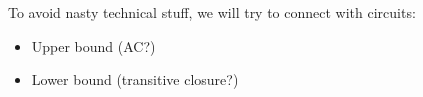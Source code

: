 To avoid nasty technical stuff, we will try to connect with circuits:
\begin{itemize}
\item Upper bound (AC?)
\item Lower bound (transitive closure?)
\end{itemize}